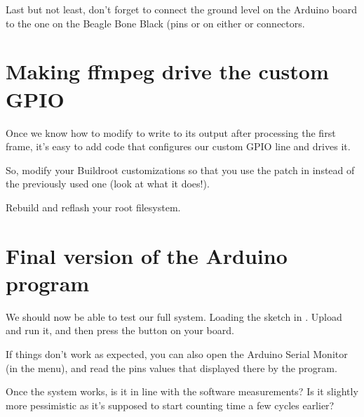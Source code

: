 Last but not least, don't forget to connect the ground level
on the Arduino board to the one on the Beagle Bone Black (pins 
or  on either  or  connectors.

\section{Making ffmpeg drive the custom GPIO}

Once we know how to modify  to write to its output after
processing the first frame, it's easy to add code that configures our
custom GPIO line and drives it.

So, modify your Buildroot customizations so that you use the patch in
instead of the previously used one (look at what it does!).

Rebuild and reflash your root filesystem.

\section{Final version of the Arduino program}

We should now be able to test our full system.  Loading the sketch in
. Upload and run it, and then
press the  button on your board.

If things don't work as expected, you can also open the Arduino Serial
Monitor (in the  menu), and read the pins values that
displayed there by the program.

Once the system works, is it in line with the software measurements?
Is it slightly more pessimistic as it's supposed to start counting
time a few cycles earlier?

